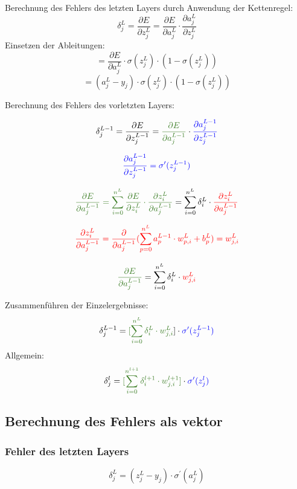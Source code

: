 \documentclass{article}
\begin{document}
Berechnung des Fehlers des letzten Layers durch Anwendung der Kettenregel:
\[ \delta_j^L  = \frac{\partial E}{\partial z_j^L}
= \frac{\partial E}{\partial a_j^L} \cdot \frac{\partial a_j^L}{\partial z_j^L}\]
Einsetzen der Ableitungen:
\[ = \frac{\partial E}{\partial a_j^L} \cdot \sigma (z_j^L) \cdot (1 - \sigma (z_j^L)) \]
\[ = (a_j^L - y_j) \cdot \sigma (z_j^L) \cdot (1 - \sigma (z_j^L)) \]

Berechnung des Fehlers des vorletzten Layers:

\[ \delta_j^{L-1}  = \frac{\partial E}{\partial z_j^{L-1}} 
= \textcolor{OliveGreen}{\frac{\partial E}{\partial a_j^{L-1}}} \cdot \textcolor{blue}{\frac{\partial a_j^{L-1}}{\partial z_j^{L-1}}} \]

\[ \textcolor{blue}{\frac{\partial a_j^{L-1}}{\partial z_j^{L-1}} = \sigma^{\prime}(z_j^{L-1})} \]

\[ \textcolor{OliveGreen}{ \frac{\partial E}{\partial a_j^{L-1}} = \sum_{i 
= 0}^{n^L} \frac{\partial E}{\partial z_i^L} \cdot \frac{\partial z_i^L}{\partial a_j^{L-1}} }
= \sum_{i = 0}^{n^L} \delta_i^L \cdot \textcolor{red}{ \frac{\partial z_i^L}{\partial a_j^{L-1}} } \]

\[ \textcolor{red}{ \frac{\partial z_i^L}{\partial a_j^{L-1}}
= \frac{\partial}{\partial a_j^{L-1}} (\sum_{p = 0}^{n^L} a_p^{L-1} \cdot w_{p,i}^L + b_p^L) = w_{j, i}^L } \]

\[ \textcolor{OliveGreen}{ \frac{\partial E}{\partial a_j^{L-1}} } = \sum_{i = 0}^{n^L} \delta_i^L \cdot \textcolor{red}{ w_{j,i}^L } \]

Zusammenführen der Einzelergebnisse:
\[ \delta_j^{L-1} = \textcolor{OliveGreen}{[\sum_{i = 0}^{n^{L}} \delta_i^{L} \cdot w_{j,i}^{L} }] \cdot \textcolor{blue}{ \sigma^{\prime}(z_j^{L-1}) } \]
Allgemein:
\[ \delta_j^{l} = \textcolor{OliveGreen}{ [\sum_{i = 0}^{n^{l+1}} \delta_i^{l+1} \cdot w_{j,i}^{l+1}] } \cdot \textcolor{blue}{ \sigma^{\prime}(z_j^{l}) } \]


\subsection{Berechnung des Fehlers als vektor}


\subsubsection{Fehler des letzten Layers}
\[ \delta_j^L = (z_j^L - y_j) \cdot \sigma^{\prime} (a_j^L)  \]
\end{document}
